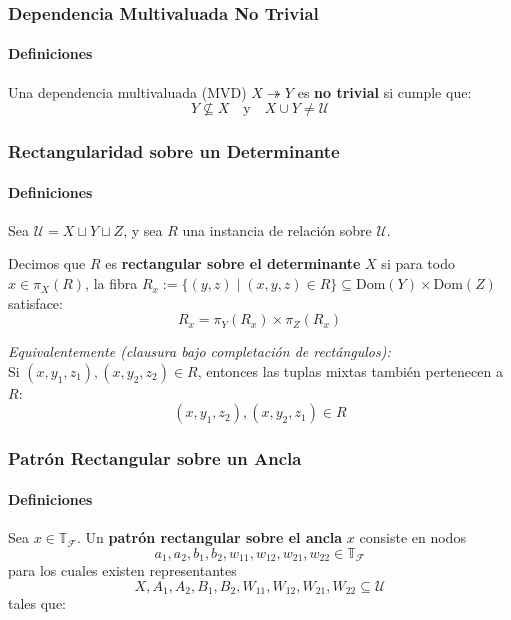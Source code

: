 \documentclass[aspectratio=169,12pt]{beamer}
\begin{document}
\begin{frame}
    \frametitle{Dependencia Multivaluada No Trivial}
    \framesubtitle{Definiciones}

    Una dependencia multivaluada (MVD) $X \twoheadrightarrow Y$ es \textbf{no trivial} si cumple que:
    \[ Y \not\subseteq X \quad \text{y} \quad X \cup Y \neq \mathcal{U} \]
\end{frame}

\begin{frame}
    \frametitle{Rectangularidad sobre un Determinante}
    \framesubtitle{Definiciones}

    Sea $\mathcal{U} = X \sqcup Y \sqcup Z$, y sea $R$ una instancia de relación sobre $\mathcal{U}$. 
    
    \vspace{0.3cm}
    
    Decimos que $R$ es \textbf{rectangular sobre el determinante} $X$ si para todo $x \in \pi_X(R)$, la fibra $R_x := \{(y,z) \mid (x,y,z) \in R\} \subseteq \mathrm{Dom}(Y) \times \mathrm{Dom}(Z)$ satisface:
    \[ R_x = \pi_Y(R_x) \times \pi_Z(R_x) \]

    \vspace{0.3cm}
    
    \textit{Equivalentemente (clausura bajo completación de rectángulos):} \\
    Si $(x, y_1, z_1), (x, y_2, z_2) \in R$, entonces las tuplas mixtas también pertenecen a $R$:
    \[ (x, y_1, z_2), (x, y_2, z_1) \in R \]
\end{frame}

\begin{frame}
    \frametitle{Patrón Rectangular sobre un Ancla}
    \framesubtitle{Definiciones}

    Sea $x \in \mathbb{T}_{\mathcal{F}}$. Un \textbf{patrón rectangular sobre el ancla} $x$ consiste en nodos
    \[ a_1, a_2, b_1, b_2, w_{11}, w_{12}, w_{21}, w_{22} \in \mathbb{T}_{\mathcal{F}} \]
    para los cuales existen representantes
    \[ X, A_1, A_2, B_1, B_2, W_{11}, W_{12}, W_{21}, W_{22} \subseteq \mathcal{U} \]
    tales que:
\end{frame}
\end{document}
